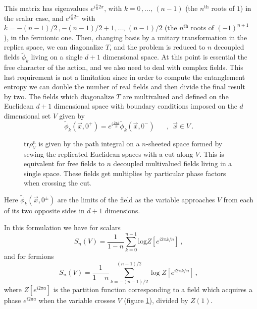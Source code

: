 \documentclass[a4paper]{article}
\begin{document}
This matrix has eigenvalues $e^{i\frac{k}{n}2\pi }$, with
$k=0\,,...,\,(n-1)$ (the $n^{\textrm{th}}$ roots of $1$) in the scalar case, and $e^{i\frac{k}{n}2\pi }$ with $k=-(n-1)/2\,, -(n-1)/2+1,...,\,(n-1)/2$ (the $n^{\textrm{th}}$ roots of $(-1)^{n+1}$), in the fermionic one. 
Then, changing basis by a unitary transformation in the replica space,
we can diagonalize $T$, and the problem is reduced to $n$ decoupled
fields $\tilde{\phi}_{k}$ living on a single $d+1$ dimensional space. At this point is essential the free character of the action, and we also need to deal with complex fields. This last requirement is not a limitation since in order to compute the entanglement entropy we can double the number of real fields and then divide the final result by two. The fields which diagonalize $T$ are multivalued and defined on the Euclidean $d+1$ dimensional space with boundary conditions imposed on the $d$ dimensional set $V$ given by
\begin{equation}
\tilde{\phi}_k(\vec{x},0^+)=e^{i\frac{2 \pi k}{n}}\tilde{\phi}_k(\vec{x},0^-)\,\,\,\,\,\,\,\,\,\,,\,\, \, \vec{x}\in V\,.
\label{bc}
\end{equation}
\begin{figure} [tbp]
\centering
\leavevmode
\epsfxsize=10cm
\bigskip
{}
\caption{tr$\rho^n_V$ is given by the path integral on a $n$-sheeted space formed by sewing the replicated Euclidean spaces with a cut along $V$.  This is equivalent for free fields to $n$ decoupled multivalued fields living in a single space. These fields get multiplies by particular phase factors when crossing the cut.}
\label{figu2}
\end{figure}
Here $\tilde{\phi}_k(\vec{x},0^\pm)$ are the limits of the field as the variable approaches $V$ from each of its two opposite sides in $d+1$ dimensions.
 
In this formulation we have for scalars 
\begin{equation}
S_n(V)=\frac{1}{1-n}\sum_{k=0}^{n-1}\textrm{log}Z[e^{i 2 \pi k/n}]\,,
\label{r1}
\end{equation}
and for fermions 
\begin{equation}
S_n(V)=\frac{1}{1-n}\sum_{k=-(n-1)/2}^{(n-1)/2}\log Z[e^{i 2 \pi k/n}]\,,
\label{r2}
\end{equation}
where $Z[e^{i 2 \pi a}]$ is the partition function corresponding to a field which acquires a phase $e^{i2\pi a}$ when the variable crosses $V$ (figure \ref{figu2}), divided by $Z(1)$. 
\end{document}
